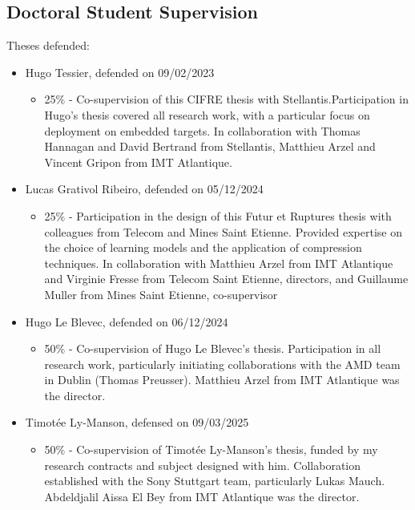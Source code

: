 \documentclass[11pt]{report}
\begin{document}
\subsection{Doctoral Student Supervision}
Theses defended:
\begin{itemize}
  \item Hugo Tessier, defended on 09/02/2023
        \begin{itemize}
          \item 25\% - Co-supervision of this CIFRE thesis with Stellantis.Participation in Hugo's thesis covered all research work, with a particular focus on deployment on embedded targets. In collaboration with Thomas Hannagan and David Bertrand from Stellantis, Matthieu Arzel and Vincent Gripon from IMT Atlantique.
        \end{itemize}
  \item Lucas Grativol Ribeiro, defended on 05/12/2024
        \begin{itemize}
          \item 25\% - Participation in the design of this Futur et Ruptures thesis with colleagues from Telecom and Mines Saint Etienne. Provided expertise on the choice of learning models and the application of compression techniques. In collaboration with Matthieu Arzel from IMT Atlantique and Virginie Fresse from Telecom Saint Etienne, directors, and Guillaume Muller from Mines Saint Etienne, co-supervisor
        \end{itemize}
  \item Hugo Le Blevec, defended on 06/12/2024
        \begin{itemize}
          \item 50\% - Co-supervision of Hugo Le Blevec's thesis. Participation in all research work, particularly initiating collaborations with the AMD team in Dublin (Thomas Preusser). Matthieu Arzel from IMT Atlantique was the director.
        \end{itemize}
  \item Timotée Ly-Manson, defensed on 09/03/2025
        \begin{itemize}
          \item 50\% - Co-supervision of Timotée Ly-Manson's thesis, funded by my research contracts and subject designed with him. Collaboration established with the Sony Stuttgart team, particularly Lukas Mauch. Abdeldjalil Aissa El Bey from IMT Atlantique was the director.
        \end{itemize}
\end{itemize}
\end{document}
